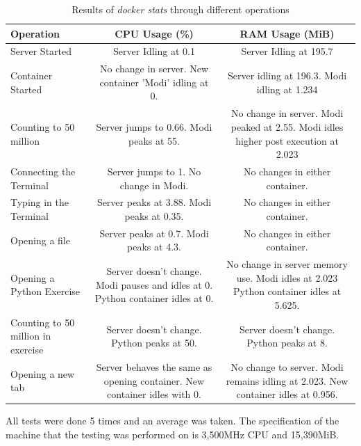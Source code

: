 \begin{table}[h!]
    \centering
    \begin{tabulary}{\textwidth}{L|C|C}
        \hline
        \hline
        \textbf{Operation} & \textbf{CPU Usage (\%)} & \textbf{RAM Usage (MiB)}\\
        \hline
        \hline
        Server Started & Server Idling at 0.1 & Server Idling at 195.7\\
        
        Container Started & No change in server. New container 'Modi' idling at 0. & Server idling at 196.3. Modi idling at 1.234\\
        
        Counting to 50 million & Server jumps to 0.66. Modi peaks at 55. & No change in server. Modi peaked at 2.55. Modi idles higher post execution at 2.023\\
        
        Connecting the Terminal & Server jumps to 1. No change in Modi. & No changes in either container.\\
        
        Typing in the Terminal & Server peaks at 3.88. Modi peaks at 0.35. & No changes in either container.\\
        
        Opening a file & Server peaks at 0.7. Modi peaks at 4.3. & No changes in either container.\\
        
        Opening a Python Exercise & Server doesn't change. Modi pauses and idles at 0. Python container idles at 0. & No change in server memory use. Modi idles at 2.023 Python container idles at 5.625.\\
        
        Counting to 50 million in exercise & Server doesn't change. Python peaks at 50. & Server doesn't change. Python peaks at 8.\\
        
        Opening a new tab & Server behaves the same as opening container. New container idles with 0. & No change to server. Modi remains idling at 2.023. New container idles at 0.956.
    \end{tabulary}
    \caption{Results of \textit{docker stats} through different operations}
\end{table}

All tests were done 5 times and an average was taken. The specification of the machine that the testing was performed on is 3,500MHz CPU and 15,390MiB.

